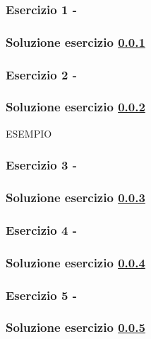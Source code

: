 \documentclass[../main.tex]{subfiles}
\begin{document}
\subsubsection{Esercizio 1 - }
\label{e2ee1}

\subsubsection*{Soluzione esercizio \ref{e2ee1}}

\vspace*{1.5cm}
\subsubsection{Esercizio 2 - }
\label{e2ee2}

\subsubsection*{Soluzione esercizio \ref{e2ee2}}

ESEMPIO

\vspace*{1.5cm}
\subsubsection{Esercizio 3 - }
\label{e2ee3}

\subsubsection*{Soluzione esercizio \ref{e2ee3}}

\vspace*{1.5cm}
\subsubsection{Esercizio 4 - }
\label{e2ee4}

\subsubsection*{Soluzione esercizio \ref{e2ee4}}

\vspace*{1.5cm}
\subsubsection{Esercizio 5 - }
\label{e2ee5}

\subsubsection*{Soluzione esercizio \ref{e2ee5}}
\end{document}
